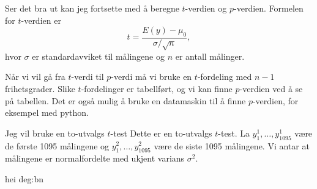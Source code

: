 Ser det bra ut kan jeg fortsette med å beregne $t$-verdien og $p$-verdien.
Formelen for $t$-verdien er
$$
t = \frac{E(y) - \mu_0}{\sigma/\sqrt{n}},
$$
hvor $\sigma$ er standardavviket til målingene og $n$ er antall målinger.

Når vi vil gå fra $t$-verdi til $p$-verdi må vi bruke en $t$-fordeling med $n-1$ frihetsgrader.
Slike $t$-fordelinger er tabellført, og vi kan finne $p$-verdien ved å se på tabellen. Det er også
mulig å bruke en datamaskin til å finne $p$-verdien, for eksempel med python.

Jeg vil bruke en to-utvalgs $t$-test
Dette er en to-utvalgs $t$-test. La $y^1_1, \dots, y^1_{1095}$ være
de første 1095 målingene og $y^2_1, \dots, y^2_{1095}$ være de siste 1095
målingene. Vi antar at målingene er normalfordelte med ukjent varians $\sigma^2$.

hei
deg:bn
